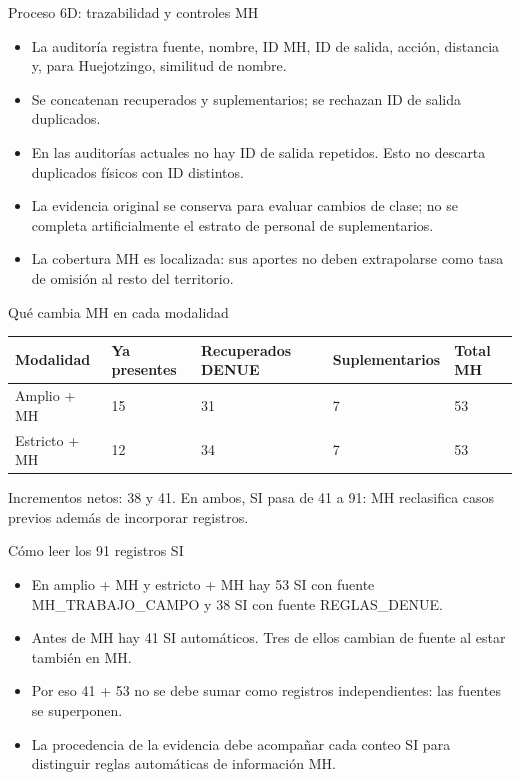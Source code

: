 \documentclass[aspectratio=169,10pt]{beamer}
\begin{document}
\begin{frame}{Proceso 6D: trazabilidad y controles MH}
\small
\begin{itemize}
\item La auditoría registra fuente, nombre, ID MH, ID de salida, acción, distancia y, para Huejotzingo, similitud de nombre.
\item Se concatenan recuperados y suplementarios; se rechazan ID de salida duplicados.
\item En las auditorías actuales no hay ID de salida repetidos. Esto no descarta duplicados físicos con ID distintos.
\item La evidencia original se conserva para evaluar cambios de clase; no se completa artificialmente el estrato de personal de suplementarios.
\item La cobertura MH es localizada: sus aportes no deben extrapolarse como tasa de omisión al resto del territorio.
\end{itemize}
\end{frame}
\begin{frame}{Qué cambia MH en cada modalidad}\centering\scriptsize
\begin{tabular}{lllll}\toprule
Modalidad & Ya presentes & Recuperados DENUE & Suplementarios & Total MH\\\midrule
Amplio + MH & 15 & 31 & 7 & 53\\
Estricto + MH & 12 & 34 & 7 & 53\\
\bottomrule\end{tabular}
\par\medskip Incrementos netos: 38 y 41. En ambos, SI pasa de 41 a 91: MH reclasifica casos previos además de incorporar registros.\end{frame}
\begin{frame}{Cómo leer los 91 registros SI}
\small
\begin{itemize}
\item En amplio + MH y estricto + MH hay 53 SI con fuente MH\_TRABAJO\_CAMPO y 38 SI con fuente REGLAS\_DENUE.
\item Antes de MH hay 41 SI automáticos. Tres de ellos cambian de fuente al estar también en MH.
\item Por eso 41 + 53 no se debe sumar como registros independientes: las fuentes se superponen.
\item La procedencia de la evidencia debe acompañar cada conteo SI para distinguir reglas automáticas de información MH.
\end{itemize}
\end{frame}
\end{document}
